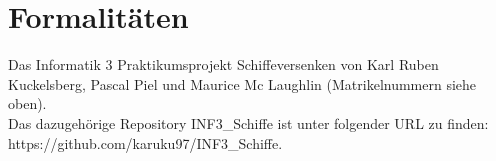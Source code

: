 \section*{Formalitäten}

Das Informatik 3 Praktikumsprojekt Schiffeversenken von Karl Ruben Kuckelsberg, Pascal Piel und Maurice Mc Laughlin (Matrikelnummern siehe oben).\\
Das dazugehörige Repository INF3_Schiffe ist unter folgender URL zu finden: https://github.com/karuku97/INF3_Schiffe.

